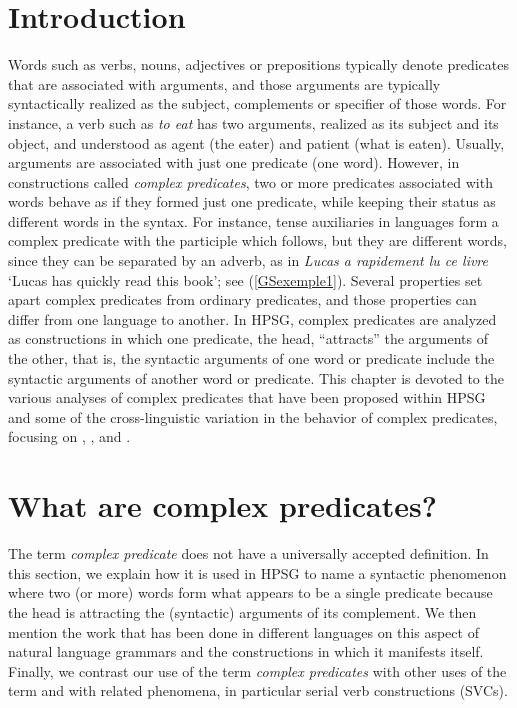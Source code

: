 
\maketitle
\label{chap-complex-predicates}


\section{Introduction}

Words such as verbs, nouns, adjectives or prepositions typically denote predicates that are
associated with arguments, and those arguments are typically syntactically realized as the subject,
complements or specifier of those words. For instance, a verb such as \textit{to eat} has two
arguments, realized as its subject and its object, and understood as agent (the eater) and patient
(what is eaten). Usually, arguments are associated with just one predicate (one word). However, in
constructions called \textit{complex predicates}, two or more predicates associated with words
behave as if they formed just one predicate, while keeping their status as different words in the
syntax.  For instance, tense auxiliaries in  languages form a complex predicate with
the participle which follows, but they are different words, since they can be separated by an
adverb, as in  \emph{Lucas a rapidement lu ce livre} `Lucas has quickly read this book';
see (\ref{GSexemple1}).  Several properties set apart complex predicates from ordinary predicates,
and those properties can differ from one language to another. In HPSG, complex predicates are
analyzed as constructions in which one predicate, the head, ``attracts'' the arguments of the other,
that is, the syntactic arguments of one word or predicate include the syntactic arguments of another
word or predicate. This chapter is devoted to the various analyses of complex predicates that have
been proposed within HPSG and some of the cross-linguistic variation in the behavior of complex
predicates, focusing on , ,  and .

\section{What are complex predicates?}


The term \textit{complex predicate} does not have a universally accepted definition. In this section, we explain
how it is used in HPSG to name a syntactic phenomenon where two (or more) words 
form what appears to be a single predicate because the head is attracting the (syntactic) arguments of its complement.
We then mention the work that has been done in different languages on this aspect of natural language grammars and the constructions in which it manifests itself. 
Finally, we contrast our use of the term \textit{complex predicates} with other uses of the term and
with related phenomena, in particular serial verb constructions (SVCs). 

